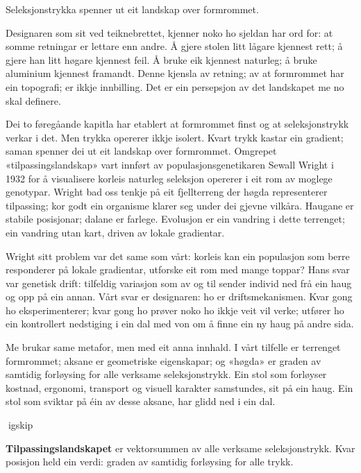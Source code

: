
Seleksjonstrykka spenner ut eit landskap over formrommet.

Designaren som sit ved teiknebrettet, kjenner noko ho sjeldan har ord for: at somme retningar er lettare enn andre. Å gjere stolen litt lågare kjennest rett; å gjere han litt høgare kjennest feil. Å bruke eik kjennest naturleg; å bruke aluminium kjennest framandt. Denne kjensla av retning; av at formrommet har ein topografi; er ikkje innbilling. Det er ein persepsjon av det landskapet me no skal definere.

Dei to føregåande kapitla har etablert at formrommet finst og at seleksjonstrykk verkar i det. Men trykka opererer ikkje isolert. Kvart trykk kastar ein gradient; saman spenner dei ut eit landskap over formrommet. Omgrepet «tilpassingslandskap» vart innført av populasjonsgenetikaren Sewall Wright i 1932 for å visualisere korleis naturleg seleksjon opererer i eit rom av moglege genotypar. Wright bad oss tenkje på eit fjellterreng der høgda representerer tilpassing; kor godt ein organisme klarer seg under dei gjevne vilkåra. Haugane er stabile posisjonar; dalane er farlege. Evolusjon er ein vandring i dette terrenget; ein vandring utan kart, driven av lokale gradientar.

Wright sitt problem var det same som vårt: korleis kan ein populasjon som berre responderer på lokale gradientar, utforske eit rom med mange toppar? Hans svar var genetisk drift: tilfeldig variasjon som av og til sender individ ned frå ein haug og opp på ein annan. Vårt svar er designaren: ho er driftsmekanismen. Kvar gong ho eksperimenterer; kvar gong ho prøver noko ho ikkje veit vil verke; utfører ho ein kontrollert nedstiging i ein dal med von om å finne ein ny haug på andre sida.

Me brukar same metafor, men med eit anna innhald. I vårt tilfelle er terrenget formrommet; aksane er geometriske eigenskapar; og «høgda» er graden av samtidig forløysing for alle verksame seleksjonstrykk. Ein stol som forløyser kostnad, ergonomi, transport og visuell karakter samstundes, sit på ein haug. Ein stol som sviktar på éin av desse aksane, har glidd ned i ein dal.

igskip

\textbf{Tilpassingslandskapet} er vektorsummen av alle verksame seleksjonstrykk. Kvar posisjon held ein verdi: graden av samtidig forløysing for alle trykk.


